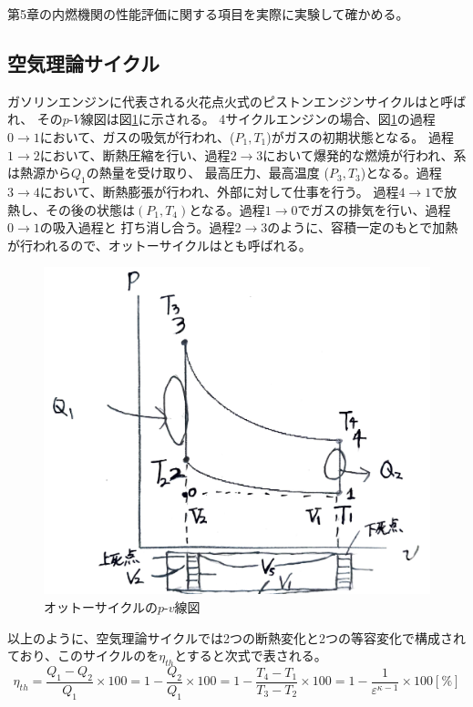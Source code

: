 第5章の内燃機関の性能評価に関する項目を実際に実験して確かめる。
\subsection{空気理論サイクル}
ガソリンエンジンに代表される火花点火式のピストンエンジンサイクルはと呼ばれ、
その$p$-$V$線図は図\ref{im1}に示される。
4サイクルエンジンの場合、図\ref{im1}の過程$0 \rightarrow 1$において、ガスの吸気が行われ、($P_1, T_1$)がガスの初期状態となる。
過程$1 \rightarrow 2$において、断熱圧縮を行い、過程$2 \rightarrow 3$において爆発的な燃焼が行われ、系は熱源から$Q_1$の熱量を受け取り、
最高圧力、最高温度 ($P_3, T_3$)となる。過程$3 \rightarrow 4$において、断熱膨張が行われ、外部に対して仕事を行う。
過程$4 \rightarrow 1$で放熱し、その後の状態は$(P_1, T_4)$となる。過程$1 \rightarrow 0$でガスの排気を行い、過程$0 \rightarrow 1$の吸入過程と
打ち消し合う。過程$2 \rightarrow 3$のように、容積一定のもとで加熱が行われるので、オットーサイクルはとも呼ばれる。\cite{netsu}
\begin{figure}[h]
  \begin{center}
  \includegraphics[width=.8\columnwidth]{img/1.pdf}
  \caption{オットーサイクルの$p$-$v$線図\cite{shiryo}}
  \label{im1}
  \end{center}
\end{figure}
以上のように、空気理論サイクルでは2つの断熱変化と2つの等容変化で構成されており、このサイクルのを$\eta_{th}$とすると次式で表される。
$$\eta_{th} = \frac{Q_1-Q_2}{Q_1}\times 100 = 1-\frac{Q_2}{Q_1} \times 100 = 1-\frac{T_4-T_1}{T_3-T_2} \times 100 = 1-\frac{1}{\varepsilon^{\kappa-1}} \times 100 \si{[\%]}$$


